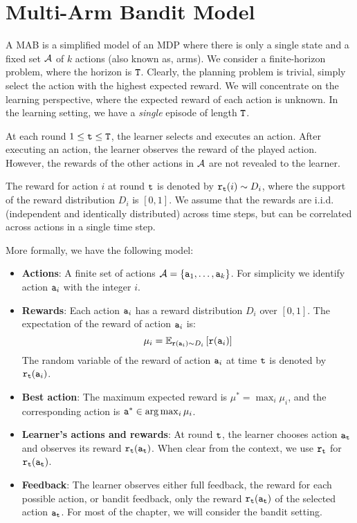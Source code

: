 
\section{Multi-Arm Bandit Model}

A MAB is a simplified model of an MDP where there is only a
single state and a fixed set $\mathcal{A}$ of $k$ actions (also known as, arms). We consider a finite-horizon problem, where the horizon is ${\tt T}$.
Clearly, the planning problem is trivial, simply select the action with the highest expected reward. We will concentrate on the learning perspective, where the expected reward of each action is unknown. In the learning setting, we  have a \emph{single} episode of length ${\tt T}$.

At each round $1\leq {\tt t}\leq {\tt T}$, the learner selects and executes an action. After executing an action, the learner observes the reward of the played action. However, the rewards of the other actions in $\mathcal{A}$ are not revealed to the learner.

The reward for action $i$ at round ${\tt t}$ is denoted by ${\tt r}_{{\tt t}}(i)\sim D_{i}$, where the support of the reward distribution $D_{i}$ is $[0,1]$. We assume that the rewards are i.i.d. (independent and identically distributed) across time steps, but can be correlated across actions in a single time step.

More formally, we have the following model:
\begin{itemize}
\item \textbf{Actions}: A finite set of actions $\mathcal{A}=\left\{ {\tt a}_{1},\dots,{\tt a}_{k}\right\} $. For simplicity we identify action ${\tt a}_i$ with the integer $i$.
\item \textbf{Rewards}: Each action ${\tt a}_{i}$ has a reward distribution $D_{i}$ over $[0,1]$. The expectation of the reward of action ${\tt a}_i$ is:
\[
\mu_{i}=\mathbb{E}_{{\tt r}({\tt a}_i)\sim D_{i}}\left[{\tt r}({\tt a}_i)\right]
\]
The random variable of the reward of action ${\tt a}_i$ at time ${\tt t}$ is denoted by ${\tt r}_{\tt t}({\tt a}_i)$.
\item \textbf{Best action}: The maximum expected reward is $\mu^{*}= \max_{i}\mu_{i}$, and the corresponding action is ${\tt a}^*\in \arg\max_i\mu_i$.
\item \textbf{Learner's actions and rewards}: At round ${\tt t}$, the learner chooses action ${\tt a}_{{\tt t}}$ and observes its reward ${\tt r}_{\tt t}({\tt a}_{\tt t})$. When clear from the context, we use ${\tt r}_{\tt t}$ for ${\tt r}_{\tt t}({\tt a}_{\tt t})$.
\item \textbf{Feedback}: The learner observes either full feedback, the reward for each possible action, or bandit feedback, only the reward ${\tt r}_{\tt t}({\tt a}_{\tt t})$ of the selected action ${\tt a}_{\tt t}$. For most of the chapter, we will consider the bandit setting.
\end{itemize}

